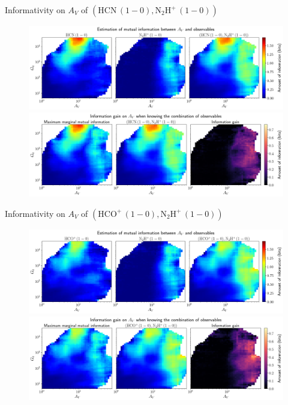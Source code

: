 \documentclass{beamer}
\begin{document}
\begin{frame}{Informativity on $A_V$ of $\left(\mathrm{HCN\,(1-0)},\mathrm{N_2H^+\,(1-0)}\right)$}
    \begin{figure}
        \centering
        \includegraphics[width=0.95\linewidth]{../mi/av__hcn10_n2hp10_mi.png}
        \vfill
        \includegraphics[width=0.95\linewidth]{../mi/av__hcn10_n2hp10_mi_gain.png}
    \end{figure}
\end{frame}

\begin{frame}{Informativity on $A_V$ of $\left(\mathrm{HCO^+\,(1-0)},\mathrm{N_2H^+\,(1-0)}\right)$}
    \begin{figure}
        \centering
        \includegraphics[width=0.95\linewidth]{../mi/av__hcop10_n2hp10_mi.png}
        \vfill
        \includegraphics[width=0.95\linewidth]{../mi/av__hcop10_n2hp10_mi_gain.png}
    \end{figure}
\end{frame}
\end{document}
